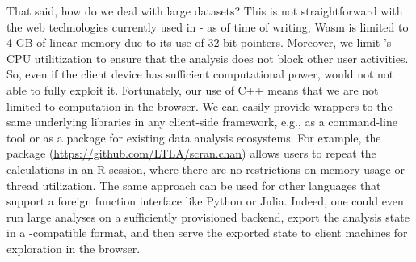 \documentclass{article}
\begin{document}
That said, how do we deal with large datasets?
This is not straightforward with the web technologies currently used in  - 
as of time of writing, Wasm is limited to 4 GB of linear memory due to its use of 32-bit pointers.
Moreover, we limit 's CPU utilitization to ensure that the analysis does not block other user activities.
So, even if the client device has sufficient computational power,  would not not able to fully exploit it.
Fortunately, our use of C++ means that we are not limited to computation in the browser.
We can easily provide wrappers to the same underlying libraries in any client-side framework, e.g., as a command-line tool or as a package for existing data analysis ecosystems.
For example, the  package (\url{https://github.com/LTLA/scran.chan}) allows users to repeat the  calculations in an R session,
where there are no restrictions on memory usage or thread utilization.
The same approach can be used for other languages that support a foreign function interface like Python or Julia.
Indeed, one could even run large analyses on a sufficiently provisioned backend, 
export the analysis state in a -compatible format,
and then serve the exported state to client machines for exploration in the browser. 



\end{document}

